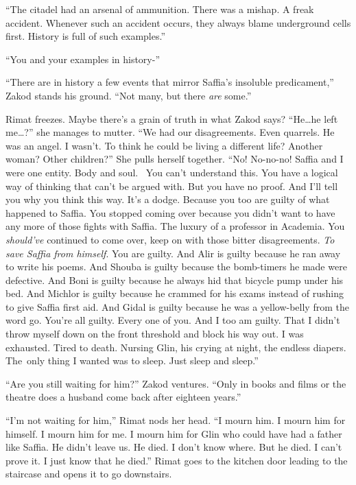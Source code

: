 \documentclass[twoside,11pt]{book}
\begin{document}
``The citadel had an arsenal of ammunition. There was a mishap. A freak accident. Whenever such an accident
occurs, they always blame underground cells first. History is full of such examples.''

``You and your examples in history-''

``There are in history a few events that mirror Saffia's insoluble predicament,'' Zakod stands
his ground. ``Not many, but there \textit{are} some.''

Rimat freezes. Maybe there's a grain of truth in what Zakod says?  ``He{\ldots}he left me{\ldots}?'' she
manages to mutter. ``We had our disagreements. Even quarrels. He was an angel. I wasn't. To think he could be living a
different life? Another woman? Other children?'' She pulls herself together. ``No! No-no-no!
Saffia and I were one entity. Body and soul.~ You can't understand this. You have a logical way of thinking that can't
be argued with. But you have no proof. And I'll tell you why you think this way. It's a dodge. Because you too are
guilty of what happened to Saffia. You stopped coming over because you didn't want to have any more of those fights
with Saffia. The luxury of a professor in Academia. You \textit{should've} continued to come over, keep on with those
bitter disagreements. \textit{To save Saffia from himself}. You are guilty. And Alir is guilty because he ran away to
write his poems. And Shouba is guilty because the bomb-timers he made were defective. And Boni is guilty because he
always hid that bicycle pump under his bed. And Michlor is guilty because he crammed for his exams instead of rushing
to give Saffia first aid. And Gidal is guilty because he was a yellow-belly from the word go.  You're all guilty.
Every one of you. And I too am guilty. That I didn't throw myself down on the front threshold and block his way out. I
was exhausted. Tired to death. Nursing Glin, his crying at night, the endless diapers. The~only thing I wanted was to
sleep. Just sleep and sleep.''

``Are you still waiting for him?'' Zakod ventures. ``Only in books and films or
the theatre does a husband come back after eighteen years.''

``I'm not waiting for him,'' Rimat nods her head. ``I mourn him. I mourn him for
himself. I mourn him for me. I mourn him for Glin who could have had a father like Saffia. He didn't leave us. He died.
I don't know where. But he died. I can't prove it. I just know that he died.'' Rimat goes to the kitchen
door leading to the staircase and opens it to go downstairs.
\end{document}
